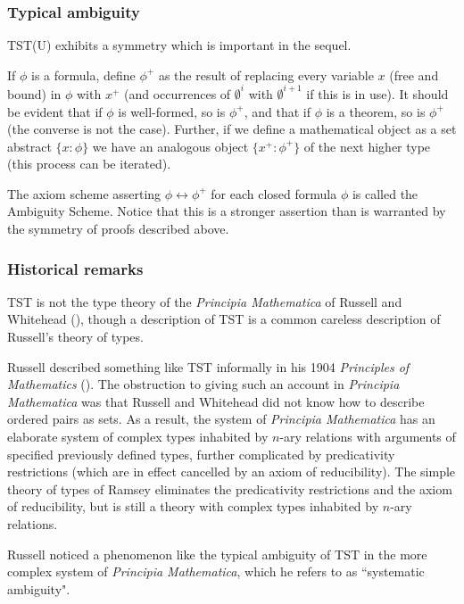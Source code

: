 \documentclass[112pt]{article}
\begin{document}
\subsubsection{Typical ambiguity}

TST(U) exhibits a symmetry which is important in the sequel.



If $\phi$ is a formula, define $\phi^+$ as the result of replacing every variable $x$ (free and bound) in $\phi$ with $x^+$ (and occurrences of $\emptyset^i$ with $\emptyset^{i+1}$ if this is in use).   It should be evident that if $\phi$ is well-formed, so is $\phi^+$,
and that if $\phi$ is a theorem, so is $\phi^+$ (the converse is not the case).  Further, if we define a mathematical object as a set abstract $\{x:\phi\}$ we have an analogous
object $\{x^+:\phi^+\}$ of the next higher type (this process can be iterated).

The axiom scheme asserting $\phi \leftrightarrow \phi^+$ for each closed formula $\phi$ is called the Ambiguity Scheme.   Notice that this is a stronger assertion than is warranted by the symmetry of proofs described above.

\subsubsection{Historical remarks}

TST is not the type theory of the {\em Principia Mathematica\/} of Russell and Whitehead (\cite{pm}), though a description of TST is a common careless description of Russell's theory of types.

Russell described something like TST informally in his 1904 {\em Principles of Mathematics\/} (\cite{pm1}).  The obstruction to giving such an account in {\em Principia Mathematica\/} was that
Russell and Whitehead did not know how to describe ordered pairs as sets.  As a result, the system of {\em Principia Mathematica\/} has an elaborate system of  complex
types inhabited by $n$-ary relations with arguments of specified previously defined types, further complicated by predicativity restrictions (which are in effect cancelled by an axiom of reducibility).
The simple theory of types of Ramsey eliminates the predicativity restrictions and the axiom of reducibility, but is still a theory with complex types inhabited by $n$-ary relations.

Russell noticed a phenomenon like the typical ambiguity of TST in the more complex system of {\em Principia Mathematica\/}, which he refers to as ``systematic ambiguity".
\end{document}
